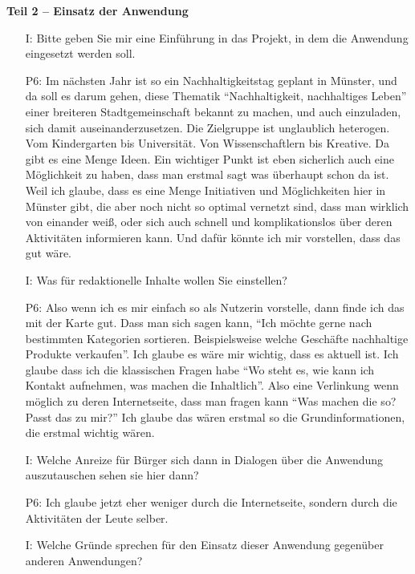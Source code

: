 \textbf{Teil 2 -- Einsatz der Anwendung}
\begin{itemize}
    \item[I:] Bitte geben Sie mir eine Einf{\"u}hrung in das Projekt, in dem die Anwendung eingesetzt werden soll.
    \item[P6:] Im n{\"a}chsten Jahr ist so ein Nachhaltigkeitstag geplant in M{\"u}nster, und da soll es darum gehen, diese Thematik "`Nachhaltigkeit, nachhaltiges Leben"' einer breiteren Stadtgemeinschaft bekannt zu machen, und auch einzuladen, sich damit auseinanderzusetzen. Die Zielgruppe ist unglaublich heterogen. Vom Kindergarten bis Universit{\"a}t. Von Wissenschaftlern bis Kreative. Da gibt es eine Menge Ideen. Ein wichtiger Punkt ist eben sicherlich auch eine M{\"o}glichkeit zu haben, dass man erstmal sagt was {\"u}berhaupt schon da ist. Weil ich glaube, dass es eine Menge Initiativen und M{\"o}glichkeiten hier in M{\"u}nster gibt, die aber noch nicht so optimal vernetzt sind, dass man wirklich von einander wei{\ss}, oder sich auch schnell und komplikationslos {\"u}ber deren Aktivit{\"a}ten informieren kann. Und daf{\"u}r k{\"o}nnte ich mir vorstellen, dass das gut w{\"a}re.
    \item[I:] Was f{\"u}r redaktionelle Inhalte wollen Sie einstellen?
    \item[P6:] Also wenn ich es mir einfach so als Nutzerin vorstelle, dann finde ich das mit der Karte gut. Dass man sich sagen kann, "`Ich m{\"o}chte gerne nach bestimmten Kategorien sortieren. Beispielsweise welche Gesch{\"a}fte nachhaltige Produkte verkaufen"'. Ich glaube es w{\"a}re mir wichtig, dass es aktuell ist. Ich glaube dass ich die klassischen Fragen habe "`Wo steht es, wie kann ich Kontakt aufnehmen, was machen die Inhaltlich"'. Also eine Verlinkung wenn m{\"o}glich zu deren Internetseite, dass man fragen kann "`Was machen die so? Passt das zu mir?"' Ich glaube das w{\"a}ren erstmal so die Grundinformationen, die erstmal wichtig w{\"a}ren.
    \item[I:] Welche Anreize f{\"u}r B{\"u}rger sich dann in Dialogen {\"u}ber die Anwendung auszutauschen sehen sie hier dann?
    \item[P6:] Ich glaube jetzt eher weniger durch die Internetseite, sondern durch die Aktivit{\"a}ten der Leute selber.
    \item[I:] Welche Gr{\"u}nde sprechen f{\"u}r den Einsatz dieser Anwendung gegen{\"u}ber anderen Anwendungen?

\end{itemize}
